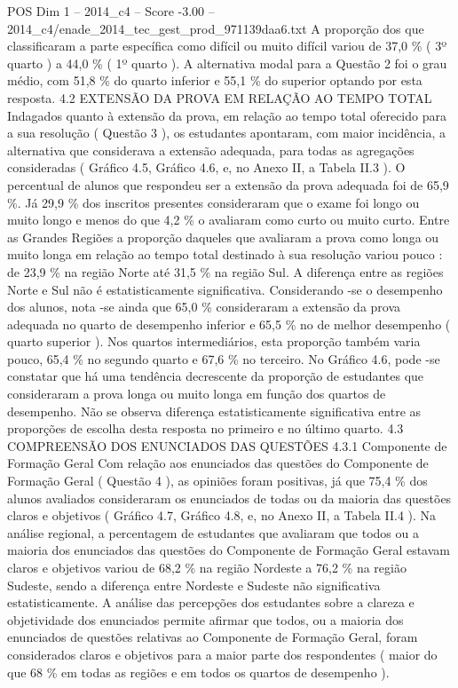 \begin{textsample}{POS Dim 1 – 2014\_c4 – Score -3.00 – 2014\_c4/enade\_2014\_tec\_gest\_prod\_971139daa6.txt}
A proporção dos que classificaram a parte específica como difícil ou muito difícil variou de 37,0 \% ( 3º quarto ) a 44,0 \% ( 1º quarto ).
A alternativa modal para a Questão 2 foi o grau médio, com 51,8 \% do quarto inferior e 55,1 \% do superior optando por esta resposta. 4.2 EXTENSÃO DA PROVA EM RELAÇÃO AO TEMPO TOTAL Indagados quanto à extensão da prova, em relação ao tempo total oferecido para a sua resolução ( Questão 3 ), os estudantes apontaram, com maior incidência, a alternativa que considerava a extensão adequada, para todas as agregações consideradas ( Gráfico 4.5, Gráfico 4.6, e, no Anexo II, a Tabela II.3 ).
O percentual de alunos que respondeu ser a extensão da prova adequada foi de 65,9 \%.
Já 29,9 \% dos inscritos presentes consideraram que o exame foi longo ou muito longo e menos do que 4,2 \% o avaliaram como curto ou muito curto.
Entre as Grandes Regiões a proporção daqueles que avaliaram a prova como longa ou muito longa em relação ao tempo total destinado à sua resolução variou pouco : de 23,9 \% na região Norte até 31,5 \% na região Sul.
A diferença entre as regiões Norte e Sul não é estatisticamente significativa.
Considerando -se o desempenho dos alunos, nota -se ainda que 65,0 \% consideraram a extensão da prova adequada no quarto de desempenho inferior e 65,5 \% no de melhor desempenho ( quarto superior ).
Nos quartos intermediários, esta proporção também varia pouco, 65,4 \% no segundo quarto e 67,6 \% no terceiro.
No Gráfico 4.6, pode -se constatar que há uma tendência decrescente da proporção de estudantes que consideraram a prova longa ou muito longa em função dos quartos de desempenho.
Não se observa diferença estatisticamente significativa entre as proporções de escolha desta resposta no primeiro e no último quarto. 4.3 COMPREENSÃO DOS ENUNCIADOS DAS QUESTÕES 4.3.1 Componente de Formação Geral Com relação aos enunciados das questões do Componente de Formação Geral ( Questão 4 ), as opiniões foram positivas, já que 75,4 \% dos alunos avaliados consideraram os enunciados de todas ou da maioria das questões claros e objetivos ( Gráfico 4.7, Gráfico 4.8, e, no Anexo II, a Tabela II.4 ).
Na análise regional, a percentagem de estudantes que avaliaram que todos ou a maioria dos enunciados das questões do Componente de Formação Geral estavam claros e objetivos variou de 68,2 \% na região Nordeste a 76,2 \% na região Sudeste, sendo a diferença entre Nordeste e Sudeste não significativa estatisticamente.
A análise das percepções dos estudantes sobre a clareza e objetividade dos enunciados permite afirmar que todos, ou a maioria dos enunciados de questões relativas ao Componente de Formação Geral, foram considerados claros e objetivos para a maior parte dos respondentes ( maior do que 68 \% em todas as regiões e em todos os quartos de desempenho ).

\end{textsample}
